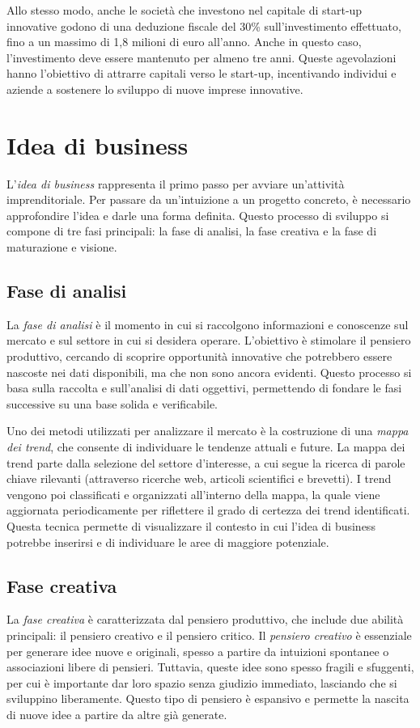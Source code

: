 Allo stesso modo, anche le società che investono nel capitale di start-up innovative godono di una deduzione fiscale del 30\% sull’investimento effettuato, fino a un massimo di 1,8 milioni di euro all’anno. Anche in questo caso, l’investimento deve essere mantenuto per almeno tre anni. Queste agevolazioni hanno l’obiettivo di attrarre capitali verso le start-up, incentivando individui e aziende a sostenere lo sviluppo di nuove imprese innovative.

\chapter{Idea di business}
L'\textit{idea di business} rappresenta il primo passo per avviare un'attività imprenditoriale. Per passare da un’intuizione a un progetto concreto, è necessario approfondire l’idea e darle una forma definita. Questo processo di sviluppo si compone di tre fasi principali: la fase di analisi, la fase creativa e la fase di maturazione e visione.

\section{Fase di analisi}
La \textit{fase di analisi} è il momento in cui si raccolgono informazioni e conoscenze sul mercato e sul settore in cui si desidera operare. L’obiettivo è stimolare il pensiero produttivo, cercando di scoprire opportunità innovative che potrebbero essere nascoste nei dati disponibili, ma che non sono ancora evidenti. Questo processo si basa sulla raccolta e sull'analisi di dati oggettivi, permettendo di fondare le fasi successive su una base solida e verificabile.

Uno dei metodi utilizzati per analizzare il mercato è la costruzione di una \textit{mappa dei trend}, che consente di individuare le tendenze attuali e future. La mappa dei trend parte dalla selezione del settore d’interesse, a cui segue la ricerca di parole chiave rilevanti (attraverso ricerche web, articoli scientifici e brevetti). I trend vengono poi classificati e organizzati all'interno della mappa, la quale viene aggiornata periodicamente per riflettere il grado di certezza dei trend identificati. Questa tecnica permette di visualizzare il contesto in cui l’idea di business potrebbe inserirsi e di individuare le aree di maggiore potenziale.

\section{Fase creativa}
La \textit{fase creativa} è caratterizzata dal pensiero produttivo, che include due abilità principali: il pensiero creativo e il pensiero critico. Il \textit{pensiero creativo} è essenziale per generare idee nuove e originali, spesso a partire da intuizioni spontanee o associazioni libere di pensieri. Tuttavia, queste idee sono spesso fragili e sfuggenti, per cui è importante dar loro spazio senza giudizio immediato, lasciando che si sviluppino liberamente. Questo tipo di pensiero è espansivo e permette la nascita di nuove idee a partire da altre già generate.

